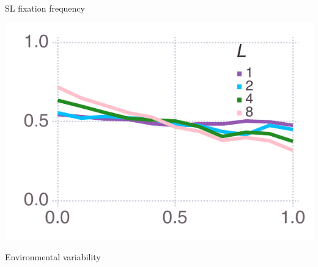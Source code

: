 \documentclass[varwidth=true,crop=false]{standalone}
\newcommand{\pisub}[1]{\pi_{\mathrm{#1}}}
\newcommand{\pilow}{\pisub{low}}
\newcommand{\meanvar}[1]{\langle #1 \rangle}
\newcommand{\meansl}{\meanvar{s}}
\begin{document}
    \begin{minipage}{3.75in}
    \begin{rotate}{90}
      {\parbox{3.0in}{
          \centering
          \vspace{-1.0em}\hspace{-2.5em}{\huge Low payoff $= 0.8$} \\[1em]
          {\huge SL fixation frequency}
      }}
    \end{rotate}%
    \hspace{2em}
      \includegraphics[width=\textwidth]{mean_social_learner_over_u_lowpayoff=0.8_nbehaviors=2.pdf}
        \\[-2.75em]
        \begin{center}
          {\hspace{3.25em} \huge Environmental variability}
      \end{center}
	  \end{minipage}\noindent\hspace{1.25em}
\end{document}
